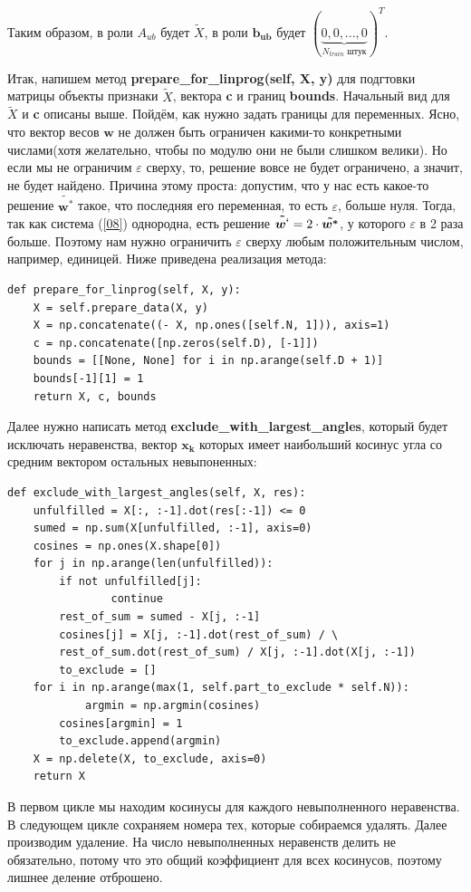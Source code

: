 \documentclass[a4paper]{article}
\newcommand{\w}{\bm{w}}
\newcommand{\xk}{\bm{x_k}}
\begin{document}
Таким образом, в роли $A_{ub}$ будет $\tilde{X}$, в роли $\bm{b_{ub}}$ будет $(\underbrace{0, 0, ..., 0}_\text{$N_{train}$ штук})^T$.

Итак, напишем метод \textbf{prepare\_for\_linprog(self, X, y)} для подгтовки матрицы объекты признаки $\tilde{X}$, вектора \textbf{c} и границ \textbf{bounds}. Начальный вид для $\tilde{X}$ и \textbf{c} описаны выше. Пойдём, как нужно задать границы для переменных. Ясно, что вектор весов $\w$ не должен быть ограничен какими-то конкретными числами(хотя желательно, чтобы по модулю они не были слишком велики). Но если мы не ограничим $\varepsilon$ сверху, то, решение вовсе не будет ограничено, а значит, не будет найдено. Причина этому проста: допустим, что у нас есть какое-то решение $\bm{\tilde{w^*}}$ такое, что последняя его переменная, то есть $\varepsilon$, больше нуля. Тогда, так как система (\ref{08}) однородна, есть решение $\bm{\tilde{w^`}} = 2 \cdot \bm{\tilde{w^*}}$, у которого $\varepsilon$ в 2 раза больше. Поэтому нам нужно ограничить $\varepsilon$ сверху любым положительным числом, например, единицей. Ниже приведена реализация метода:
\begin{lstlisting}
def prepare_for_linprog(self, X, y):
	X = self.prepare_data(X, y)
	X = np.concatenate((- X, np.ones([self.N, 1])), axis=1)
	c = np.concatenate([np.zeros(self.D), [-1]])
	bounds = [[None, None] for i in np.arange(self.D + 1)]
	bounds[-1][1] = 1
	return X, c, bounds
\end{lstlisting}

Далее нужно написать метод \textbf{exclude\_with\_largest\_angles}, который будет исключать неравенства, вектор $\xk$ которых имеет наибольший косинус угла со средним вектором остальных невыпоненных:
\begin{lstlisting}
def exclude_with_largest_angles(self, X, res):
	unfulfilled = X[:, :-1].dot(res[:-1]) <= 0
	sumed = np.sum(X[unfulfilled, :-1], axis=0)
	cosines = np.ones(X.shape[0])
	for j in np.arange(len(unfulfilled)):
		if not unfulfilled[j]:
    			continue
		rest_of_sum = sumed - X[j, :-1]
		cosines[j] = X[j, :-1].dot(rest_of_sum) / \
		rest_of_sum.dot(rest_of_sum) / X[j, :-1].dot(X[j, :-1])
		to_exclude = []
	for i in np.arange(max(1, self.part_to_exclude * self.N)):
    		argmin = np.argmin(cosines)
		cosines[argmin] = 1
		to_exclude.append(argmin)
	X = np.delete(X, to_exclude, axis=0)
	return X
\end{lstlisting}

В первом цикле мы находим косинусы для каждого невыполненного неравенства. В следующем цикле сохраняем номера тех, которые собираемся удалять. Далее производим удаление. На число невыполненных неравенств делить не обязательно, потому что это общий коэффициент для всех косинусов, поэтому лишнее деление отброшено.
\end{document}
